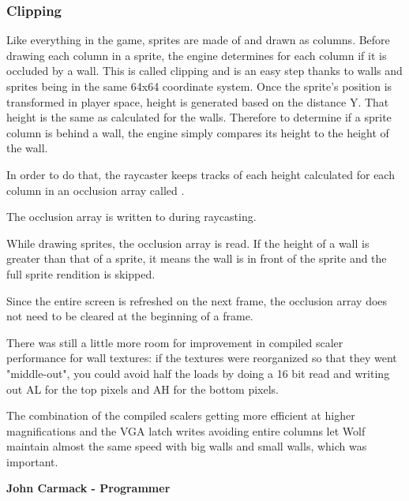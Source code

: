 \subsubsection{Clipping}
Like everything in the game, sprites are made of and drawn as columns. Before drawing each column in a sprite, the engine determines for each column if it is occluded by a wall. This is called clipping and is an easy step thanks to walls and sprites being in the same 64x64 coordinate system. Once the sprite's position is transformed in player space, height is generated based on the distance Y. That height is the same as calculated for the walls. Therefore to determine if a sprite column is behind a wall, the engine simply compares its height to the height of the wall.\\
\par
In order to do that, the raycaster keeps tracks of each height calculated for each column in an occlusion array called .\\
\par
\begin{minipage}{\textwidth}

\end{minipage}
\par
The occlusion array is written to during raycasting.\\
\par
\begin{minipage}{\textwidth}

\end{minipage}
While drawing sprites, the occlusion array is read. If the height of a wall is greater than that of a sprite, it means the wall is in front of the sprite and the full sprite rendition is skipped.\\
\par
\begin{minipage}{\textwidth}

\end{minipage}
\par
Since the entire screen is refreshed on the next frame, the occlusion array does not need to be cleared at the beginning of a frame.\\


\begin{fancyquotes}
There was still a little more room for improvement in compiled scaler performance for wall textures:  if the textures were reorganized so that they went "middle-out", you could avoid half the loads by doing a 16 bit read and writing out AL for the top pixels and AH for the bottom pixels.\\
\par 
The combination of the compiled scalers getting more efficient at higher magnifications and the VGA latch writes avoiding entire columns let Wolf maintain almost the same speed with big walls and small walls, which was important.\\
\par
\textbf{John Carmack - Programmer}
 \end{fancyquotes}


